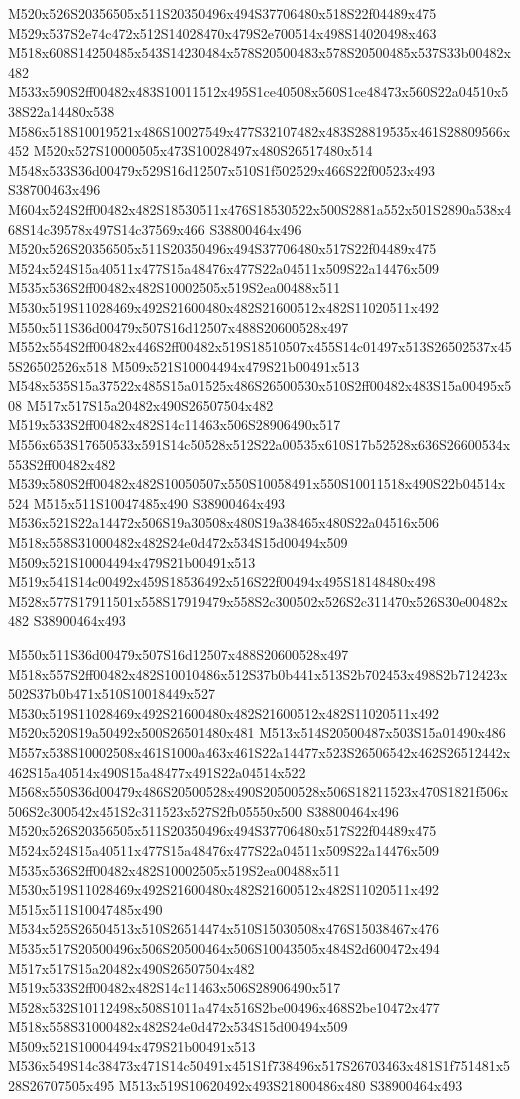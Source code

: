 \documentclass{article}
\begin{document}
\begin{multicols}{2}
M520x526S20356505x511S20350496x494S37706480x518S22f04489x475 M529x537S2e74c472x512S14028470x479S2e700514x498S14020498x463 M518x608S14250485x543S14230484x578S20500483x578S20500485x537S33b00482x482 M533x590S2ff00482x483S10011512x495S1ce40508x560S1ce48473x560S22a04510x538S22a14480x538 M586x518S10019521x486S10027549x477S32107482x483S28819535x461S28809566x452 M520x527S10000505x473S10028497x480S26517480x514 M548x533S36d00479x529S16d12507x510S1f502529x466S22f00523x493 S38700463x496 M604x524S2ff00482x482S18530511x476S18530522x500S2881a552x501S2890a538x468S14c39578x497S14c37569x466 S38800464x496 M520x526S20356505x511S20350496x494S37706480x517S22f04489x475 M524x524S15a40511x477S15a48476x477S22a04511x509S22a14476x509 M535x536S2ff00482x482S10002505x519S2ea00488x511 M530x519S11028469x492S21600480x482S21600512x482S11020511x492 M550x511S36d00479x507S16d12507x488S20600528x497 M552x554S2ff00482x446S2ff00482x519S18510507x455S14c01497x513S26502537x455S26502526x518 M509x521S10004494x479S21b00491x513 M548x535S15a37522x485S15a01525x486S26500530x510S2ff00482x483S15a00495x508 M517x517S15a20482x490S26507504x482 M519x533S2ff00482x482S14c11463x506S28906490x517 M556x653S17650533x591S14c50528x512S22a00535x610S17b52528x636S26600534x553S2ff00482x482 M539x580S2ff00482x482S10050507x550S10058491x550S10011518x490S22b04514x524 M515x511S10047485x490 S38900464x493 M536x521S22a14472x506S19a30508x480S19a38465x480S22a04516x506 M518x558S31000482x482S24e0d472x534S15d00494x509 M509x521S10004494x479S21b00491x513 M519x541S14c00492x459S18536492x516S22f00494x495S18148480x498 M528x577S17911501x558S17919479x558S2c300502x526S2c311470x526S30e00482x482 S38900464x493

M550x511S36d00479x507S16d12507x488S20600528x497 M518x557S2ff00482x482S10010486x512S37b0b441x513S2b702453x498S2b712423x502S37b0b471x510S10018449x527 M530x519S11028469x492S21600480x482S21600512x482S11020511x492 M520x520S19a50492x500S26501480x481 M513x514S20500487x503S15a01490x486 M557x538S10002508x461S1000a463x461S22a14477x523S26506542x462S26512442x462S15a40514x490S15a48477x491S22a04514x522 M568x550S36d00479x486S20500528x490S20500528x506S18211523x470S1821f506x506S2c300542x451S2c311523x527S2fb05550x500 S38800464x496 M520x526S20356505x511S20350496x494S37706480x517S22f04489x475 M524x524S15a40511x477S15a48476x477S22a04511x509S22a14476x509 M535x536S2ff00482x482S10002505x519S2ea00488x511 M530x519S11028469x492S21600480x482S21600512x482S11020511x492 M515x511S10047485x490 M534x525S26504513x510S26514474x510S15030508x476S15038467x476 M535x517S20500496x506S20500464x506S10043505x484S2d600472x494 M517x517S15a20482x490S26507504x482 M519x533S2ff00482x482S14c11463x506S28906490x517 M528x532S10112498x508S1011a474x516S2be00496x468S2be10472x477 M518x558S31000482x482S24e0d472x534S15d00494x509 M509x521S10004494x479S21b00491x513 M536x549S14c38473x471S14c50491x451S1f738496x517S26703463x481S1f751481x528S26707505x495 M513x519S10620492x493S21800486x480 S38900464x493


\end{multicols}
\end{document}
